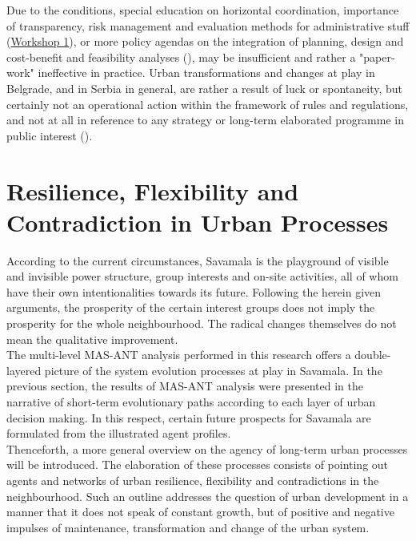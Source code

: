 \documentclass[11pt]{report}
\begin{document}
{Due to the conditions, special education on horizontal coordination, importance of transparency, risk management and evaluation methods for administrative stuff
(\href{Expert Workshop}{Workshop 1}),
or more policy agendas on the integration of planning, design and cost-benefit and feasibility analyses (\href{Zekovic}{\cite{Zekovic ??}}), may be insufficient and rather a "paper-work" ineffective in practice. 
Urban transformations and changes at play in Belgrade, and in Serbia in general, are rather a result of luck or spontaneity, but certainly not an operational action within the framework of rules and regulations, and not at all in reference to any strategy or long-term elaborated programme in public interest (\href{Vanista}{\cite{doytchinov_urban_2015}}).

\section{Resilience, Flexibility and Contradiction in Urban Processes}

According to the current circumstances, Savamala is the playground of visible and invisible power structure, group interests and on-site activities, all of whom have their own intentionalities towards its future.
Following the herein given arguments, the prosperity of the certain interest groups does not imply the prosperity for the whole neighbourhood. The radical changes themselves do not mean the qualitative improvement.
\\

The multi-level MAS-ANT analysis performed in this research offers a double-layered picture of the system evolution processes at play in Savamala.
In the previous section, the results of MAS-ANT analysis were presented in the narrative of short-term evolutionary paths according to each layer of urban decision making.
In this respect, certain future prospects for Savamala are formulated from the illustrated agent profiles.
\\

Thenceforth, a more general overview on the agency of long-term urban processes will be introduced. The elaboration of these processes consists of pointing out agents and networks of urban resilience, flexibility and contradictions in the neighbourhood.
Such an outline addresses the question of urban development in a manner that it does not speak of constant growth, but of positive and negative impulses of maintenance, transformation and change of the urban system.

}
\end{document}
